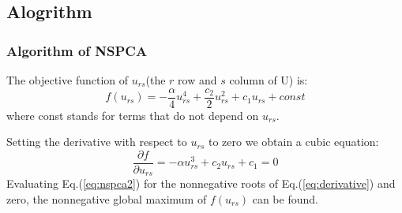 \documentclass{beamer}
\begin{document}
\subsection{Alogrithm}
\begin{frame}\frametitle{Algorithm of NSPCA}
The objective function of $u_{rs}$(the $r$ row and $s$ column of U) is:
\begin{equation}\label{eq:nspca2}
f(u_{rs})=-\frac{\alpha}{4}u_{rs}^4+\frac{c_2}{2}u_{rs}^2+c_1u_{rs}+const
\end{equation}
where const stands for terms that do not depend on $u_{rs}$.

Setting the derivative with respect to $u_{rs}$ to zero we obtain a cubic equation:
\begin{equation}\label{eq:derivative}
\frac{\partial f}{\partial u_{rs}}=-\alpha u_{rs}^3+c_2u_{rs}+c_1=0
\end{equation}
Evaluating Eq.(\ref{eq:nspca2}) for the nonnegative roots of Eq.(\ref{eq:derivative}) and zero, the nonnegative global maximum of $f(u_{rs})$ can be found.
\end{frame}
\end{document}
